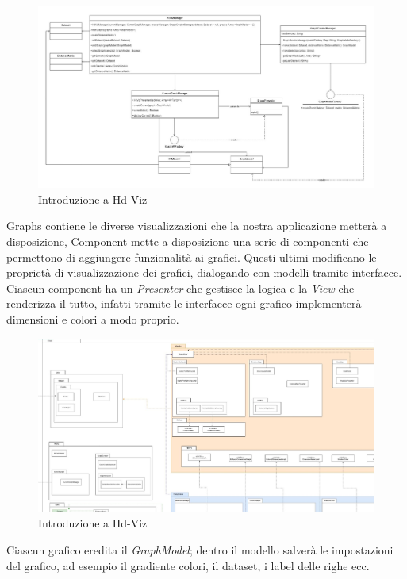 \documentclass[../manuale_sviluppatore.tex]{subfiles}
\begin{document}
\begin{figure}[H]
	\centering
	\includegraphics[width=18cm]{img/core-hdvizmanager.jpg}
	\caption{Introduzione a Hd-Viz}
\end{figure}

Graphs contiene le diverse visualizzazioni che la nostra applicazione metterà a disposizione, Component mette a disposizione una serie di componenti che permettono di aggiungere funzionalità ai grafici.
Questi ultimi modificano le proprietà di visualizzazione dei grafici, dialogando con modelli tramite interfacce. Ciascun component ha un \emph{Presenter} che gestisce la logica e la \emph{View} che renderizza il tutto,
infatti tramite le interfacce ogni grafico implementerà dimensioni e colori a modo proprio.

\begin{figure}[H]
	\centering
	\includegraphics[width=18cm]{img/graph-e-hdviz.jpg}
	\caption{Introduzione a Hd-Viz}
\end{figure}


Ciascun grafico eredita il \emph{GraphModel}; dentro il modello salverà le impostazioni del grafico, ad esempio il gradiente colori, il dataset, i label delle righe ecc.
\end{document}
